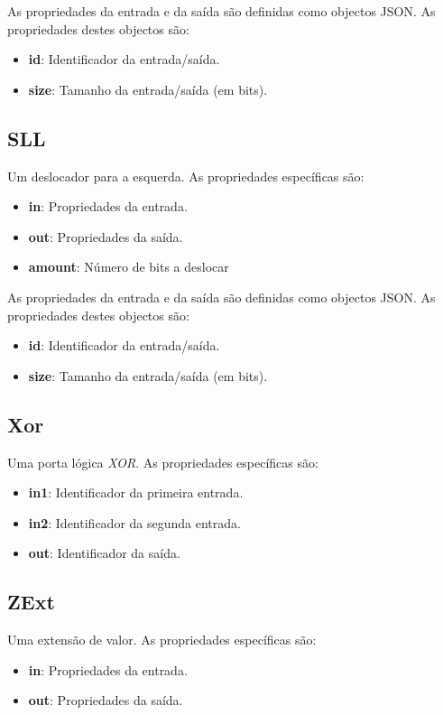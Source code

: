 \documentclass[11pt,a4paper,twoside,titlepage]{report}
\begin{document}
As propriedades da entrada e da saída são definidas como objectos JSON.
As propriedades destes objectos são:
\begin{itemize}
	\item \textbf{id}: Identificador da entrada/saída.
	\item \textbf{size}: Tamanho da entrada/saída (em bits).
\end{itemize}

\subsection{SLL}

Um deslocador para a esquerda. As propriedades específicas são:
\begin{itemize}
	\item \textbf{in}: Propriedades da entrada.
	\item \textbf{out}: Propriedades da saída.
	\item \textbf{amount}: Número de bits a deslocar
\end{itemize}

As propriedades da entrada e da saída são definidas como objectos JSON.
As propriedades destes objectos são:
\begin{itemize}
	\item \textbf{id}: Identificador da entrada/saída.
	\item \textbf{size}: Tamanho da entrada/saída (em bits).
\end{itemize}

\subsection{Xor}

Uma porta lógica \emph{XOR}. As propriedades específicas são:
\begin{itemize}
	\item \textbf{in1}: Identificador da primeira entrada.
	\item \textbf{in2}: Identificador da segunda entrada.
	\item \textbf{out}: Identificador da saída.
\end{itemize}

\subsection{ZExt}
Uma extensão de valor. As propriedades específicas são:
\begin{itemize}
	\item \textbf{in}: Propriedades da entrada.
	\item \textbf{out}: Propriedades da saída.
\end{itemize}
\end{document}
